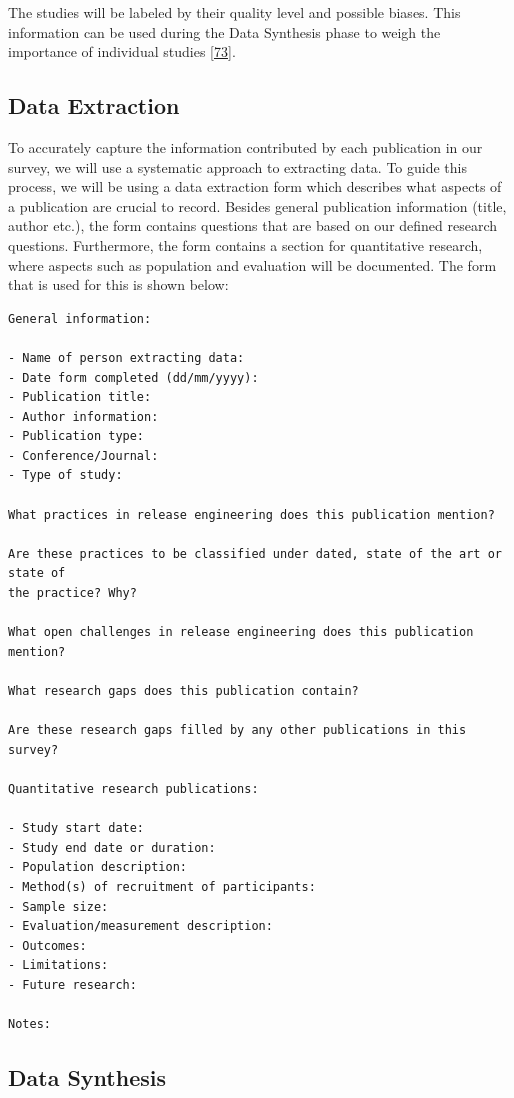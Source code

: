 \documentclass[]{book}
\begin{document}
The studies will be labeled by their quality level and possible biases.
This information can be used during the Data Synthesis phase to weigh
the importance of individual studies
{[}\protect\hyperlink{ref-kitchenham2004procedures}{73}{]}.

\subsection{Data Extraction}\label{data-extraction}

To accurately capture the information contributed by each publication in
our survey, we will use a systematic approach to extracting data. To
guide this process, we will be using a data extraction form which
describes what aspects of a publication are crucial to record. Besides
general publication information (title, author etc.), the form contains
questions that are based on our defined research questions. Furthermore,
the form contains a section for quantitative research, where aspects
such as population and evaluation will be documented. The form that is
used for this is shown below:

\begin{verbatim}
General information:

- Name of person extracting data:
- Date form completed (dd/mm/yyyy):
- Publication title:
- Author information:
- Publication type:
- Conference/Journal:
- Type of study:

What practices in release engineering does this publication mention?

Are these practices to be classified under dated, state of the art or state of
the practice? Why?

What open challenges in release engineering does this publication mention?

What research gaps does this publication contain?

Are these research gaps filled by any other publications in this survey?

Quantitative research publications:

- Study start date:
- Study end date or duration:
- Population description:
- Method(s) of recruitment of participants:
- Sample size:
- Evaluation/measurement description:
- Outcomes:
- Limitations:
- Future research:

Notes:
\end{verbatim}

\subsection{Data Synthesis}\label{data-synthesis}
\end{document}
